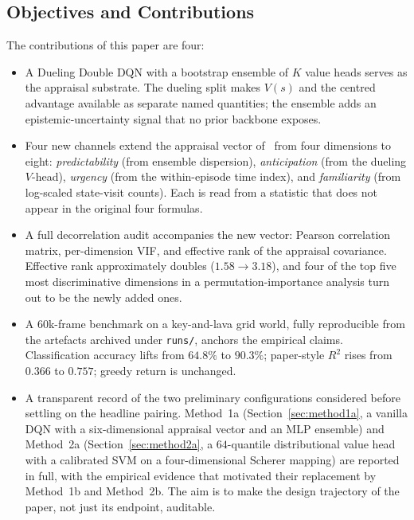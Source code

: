\documentclass[conference]{IEEEtran}
\begin{document}
\subsection{Objectives and Contributions}
The contributions of this paper are four:
\begin{itemize}
\item A Dueling Double DQN with a bootstrap ensemble of $K$ value heads
serves as the appraisal substrate. The dueling split makes $V(s)$ and
the centred advantage available as separate named quantities; the
ensemble adds an epistemic-uncertainty signal that no prior backbone
exposes.

\item Four new channels extend the appraisal vector
of~\cite{zhang2023modeling} from four dimensions to eight:
\emph{predictability} (from ensemble dispersion), \emph{anticipation}
(from the dueling $V$-head), \emph{urgency} (from the within-episode
time index), and \emph{familiarity} (from log-scaled state-visit
counts). Each is read from a statistic that does not appear in the
original four formulas.

\item A full decorrelation audit accompanies the new vector: Pearson
correlation matrix, per-dimension VIF, and effective rank of the
appraisal covariance. Effective rank approximately doubles
($1.58{\to}3.18$), and four of the top five most discriminative
dimensions in a permutation-importance analysis turn out to be the
newly added ones.

\item A 60k-frame benchmark on a key-and-lava grid world, fully
reproducible from the artefacts archived under \texttt{runs/}, anchors
the empirical claims. Classification accuracy lifts from $64.8\%$ to
$90.3\%$; paper-style $R^{2}$ rises from $0.366$ to $0.757$; greedy
return is unchanged.

\item A transparent record of the two preliminary configurations
considered before settling on the headline pairing. Method~1a
(Section~\ref{sec:method1a}, a vanilla DQN with a six-dimensional
appraisal vector and an MLP ensemble) and Method~2a
(Section~\ref{sec:method2a}, a $64$-quantile distributional value head
with a calibrated SVM on a four-dimensional Scherer mapping) are
reported in full, with the empirical evidence that motivated their
replacement by Method~1b and Method~2b. The aim is to make the design
trajectory of the paper, not just its endpoint, auditable.
\end{itemize}
\end{document}

